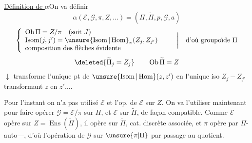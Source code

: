 \uline{Définition de $\alpha$}\qquad On va définir
\[
\alpha(\mathcal E,\mathcal G,\pi,Z,\ldots)=(\Pi,\widetilde\Pi,p,\mathcal G,a)
\]
\[
\left\{\begin{array}{l}
\operatorname{Ob}\Pi=Z/\pi\quad(\text{soit }J)\\
\operatorname{Isom}(j,j')=\unsure{\operatorname{Isom}|\operatorname{Hom}}_{\pi}(Z_j,Z_{j'})\\
\text{composition des flèches évidente}
\end{array}\right.\qquad\bigg|\quad\text{d'où groupoïde }\Pi
\]
\[
\deleted{\widetilde\Pi_j=Z_j}\qquad\operatorname{Ob}\widetilde\Pi=Z
\]
$\downarrow$ transforme l'unique pt de $\unsure{\operatorname{Isom}|\operatorname{Hom}}(z,z')$ en l'unique \inserted{$\pi$-}iso $Z_j\mathbin{-}Z_{j'}$ transformant $z$ en $z'\ldots.$

Pour l'instant on n'a pas utilisé $\mathcal E$ et l'op. de $\mathcal E$ sur $Z$. On va l'utiliser maintenant pour faire opérer $\mathcal G=\mathcal E/\pi$ sur $\Pi$, et $\mathcal E$ sur $\widetilde\Pi$, de façon compatible.
Comme $\mathcal E$ opère sur $Z=\operatorname{Ens}(\widetilde\Pi)$, il opère  sur $\widetilde\Pi$, cat. discrète associée,  et  $\pi$ opère par $\Pi$-auto---, d'où l'opération de $\mathcal G$ sur $\unsure{\pi|\Pi}$ par passage au quotient.
